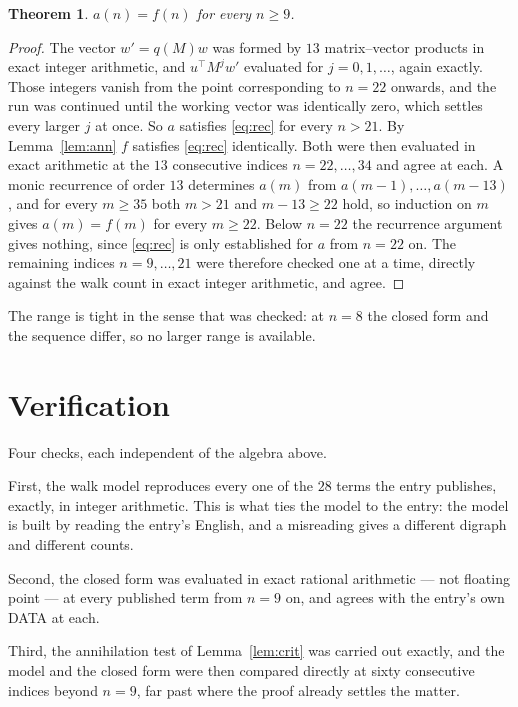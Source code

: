 \documentclass[11pt,a4paper]{article}
\theoremstyle{plain}
\newtheorem{theorem}{Theorem}
\theoremstyle{definition}
\begin{document}
\begin{theorem}
$a(n)=f(n)$ for every $n\ge9$.
\end{theorem}

\begin{proof}
The vector $w'=q(M)w$ was formed by $13$ matrix--vector products in exact integer
arithmetic, and $u^{\!\top}M^{j}w'$ evaluated for $j=0,1,\dots$, again exactly. Those integers
vanish from the point corresponding to $n=22$ onwards, and the run was continued until the
working vector was identically zero, which settles every larger $j$ at once. So $a$ satisfies
\eqref{eq:rec} for every $n>21$. By Lemma~\ref{lem:ann} $f$ satisfies \eqref{eq:rec}
identically. Both were then evaluated in exact arithmetic at the $13$ consecutive indices
$n=22,\dots,34$ and agree at each. A monic recurrence of order $13$
determines $a(m)$ from $a(m-1),\dots,a(m-13)$, and for every $m\ge35$ both
$m>21$ and $m-13\ge22$ hold, so induction on $m$ gives $a(m)=f(m)$ for every
$m\ge22$.
Below $n=22$ the recurrence argument gives nothing, since \eqref{eq:rec} is only
established for $a$ from $n=22$ on. The remaining indices $n=9,\dots,21$ were
therefore checked one at a time, directly against the walk count in exact integer arithmetic,
and agree.
\end{proof}

The range is tight in the sense that was checked: at $n=8$ the closed form and the sequence differ, so no larger range is available.

\section{Verification}

Four checks, each independent of the algebra above.

First, the walk model reproduces every one of the $28$ terms the entry publishes,
exactly, in integer arithmetic. This is what ties the model to the entry: the model is built
by reading the entry's English, and a misreading gives a different digraph and different
counts.

Second, the closed form was evaluated in exact rational arithmetic --- not floating point ---
at every published term from $n=9$ on, and agrees with the entry's own DATA at each.

Third, the annihilation test of Lemma~\ref{lem:crit} was carried out exactly, and the model
and the closed form were then compared directly at sixty consecutive indices beyond
$n=9$, far past where the proof already settles the matter.
\end{document}
